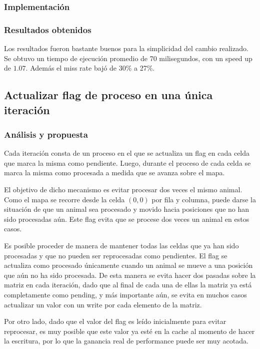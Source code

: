 \documentclass[a4paper,11pt]{article}
\begin{document}
\subsubsection{Implementación}



\subsubsection{Resultados obtenidos}

Los resultados fueron bastante buenos para la simplicidad del cambio realizado.
Se obtuvo un tiempo de ejecución promedio de 70 milisegundos, con un speed up
de \(1.07\). Además el miss rate bajó de 30\% a 27\%.

\subsection{Actualizar flag de proceso en una única iteración}

\subsubsection{Análisis y propuesta}

Cada iteración consta de un proceso en el que se actualiza un flag en cada
celda que marca la misma como pendiente. Luego, durante el proceso de cada
celda se marca la misma como procesada a medida que se avanza sobre el mapa.

El objetivo de dicho mecanismo es evitar procesar dos veces el mismo animal.
Como el mapa se recorre desde la celda \((0, 0)\) por fila y columna, puede
darse la situación de que un animal sea procesado y movido hacia posiciones que
no han sido procesadas aún. Este flag evita que se procese dos veces un animal
en estos casos.

Es posible proceder de manera de mantener todas las celdas que ya han sido
procesadas y que no pueden ser reprocesadas como pendientes. El flag se
actualiza como procesado únicamente cuando un animal se mueve a una posición
que aún no ha sido procesada. De esta manera se evita hacer dos pasadas sobre
la matriz en cada iteración, dado que al final de cada una de ellas la matriz
ya está completamente como pending, y más importante aún, se evita en muchos
casos actualizar un valor con un write por cada elemento de la matriz.

Por otro lado, dado que el valor del flag es leído inicialmente para evitar
reprocesar, es muy posible que este valor ya esté en la cache al momento de
hacer la escritura, por lo que la ganancia real de performance puede ser muy
acotada.
\end{document}
